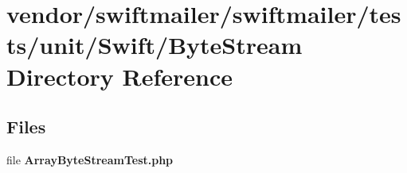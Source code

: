 \section{vendor/swiftmailer/swiftmailer/tests/unit/\+Swift/\+Byte\+Stream Directory Reference}
\label{dir_a3f3755f6ef5c82e0c133ed51a4b9354}
\subsection*{Files}
\begin{DoxyCompactItemize}
\item 
file {\bf Array\+Byte\+Stream\+Test.\+php}
\end{DoxyCompactItemize}
